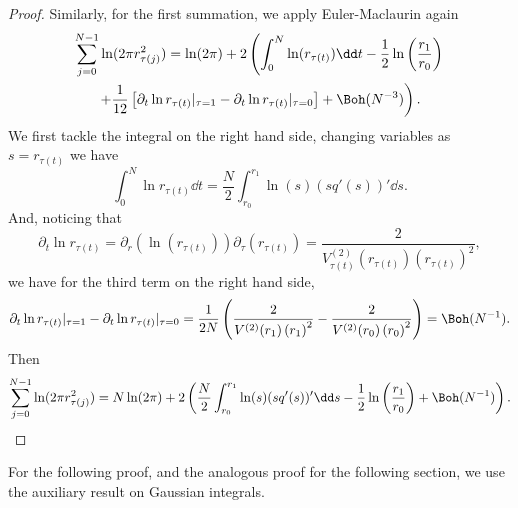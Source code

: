 \begin{proof}
	Similarly, for the first summation, we apply Euler-Maclaurin again
	\begin{multline}
		\sum_{j=0}^{N-1}  \ln(2 \pi r^2_{\tau(j)}) = \ln(2\pi) + 2 \left( \int_{0}^{N} \ln(r_{\tau(t)})  \dd t - \frac{1}{2} \ln\left(\frac{r_1}{r_0}\right) \right. \\ \left. + \frac{1}{12} \left[ \partial_t \ln r_{\tau(t)} |_{\tau=1} - \partial_t \ln r_{\tau(t)} |_{\tau=0}\right] + \Boh(N^{-3}) \right).
	\end{multline}
	We first tackle the integral on the right hand side, changing variables as $s = r_{\tau(t)}$ we have
	\begin{equation}
		\int_{0}^{N} \ln r_{\tau(t)} \dd t = \frac{N}{2} \int_{r_0}^{r_1} \ln(s) (s q'(s))' \dd s.
	\end{equation}
	And, noticing that
	\begin{equation}
		\partial_t \ln r_{\tau(t)} =  \partial_r \left( \ln(r_{\tau(t)}) \right) \partial_\tau \left( r_{\tau(t)} \right) = \frac{2}{V^{(2)}_{\tau(t)}(r_{\tau(t)}) \left( r_{\tau(t)} \right)^2},
	\end{equation}
	we have for the third term on the right hand side, 
	\begin{align}
		\partial_t \ln  r_{\tau(t)} |_{\tau=1} - \partial_t \ln  r_{\tau(t)}  |_{\tau=0}  = \frac{1}{2N} \left( \frac{2}{V^{(2)}(r_{1}) \left( r_{1} \right)^2} - \frac{2}{V^{(2)}(r_{0}) \left( r_{0} \right)^2} \right) = \Boh(N^{-1}).
	\end{align}
	Then
	\begin{equation}
		\sum_{j=0}^{N-1}  \ln(2\pi r^2_{\tau(j)}) = N \ln(2\pi) + 2 \left( \frac{N}{2} \int_{r_0}^{r_1} \ln(s) (s q'(s))' \dd s - \frac{1}{2} \ln\left(\frac{r_1}{r_0}\right) + \Boh(N^{-1}) \right) .
		\label{Equation: log(r) annulus}
	\end{equation}
\end{proof}

For the following proof, and the analogous proof for the following section, we use the auxiliary result on Gaussian integrals.


